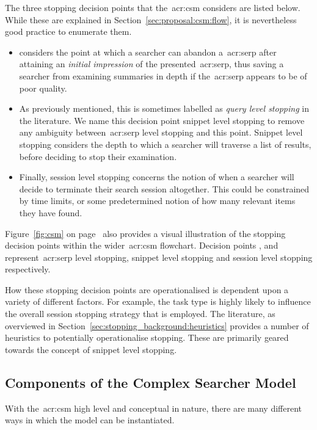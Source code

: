 The three stopping decision points that the~\gls{acr:csm} considers are listed below. While these are explained in Section~\ref{sec:proposal:csm:flow}, it is nevertheless good practice to enumerate them.

\begin{itemize}
    
    \item{ considers the point at which a searcher can abandon a~\gls{acr:serp} after attaining an \emph{initial impression} of the presented~\gls{acr:serp}, thus saving a searcher from examining summaries in depth if the~\gls{acr:serp} appears to be of poor quality.}
    
    \item{ As previously mentioned, this is sometimes labelled as \emph{query level stopping} in the literature. We name this decision point snippet level stopping to remove any ambiguity between~\gls{acr:serp} level stopping and this point. Snippet level stopping considers the depth to which a searcher will traverse a list of results, before deciding to stop their examination.}
    
    \item{ Finally, session level stopping concerns the notion of when a searcher will decide to terminate their search session altogether. This could be constrained by time limits, or some predetermined notion of how many relevant items they have found.}
    
\end{itemize}

Figure~\ref{fig:csm} on page~\pageref{fig:csm} also provides a visual illustration of the stopping decision points within the wider~\gls{acr:csm} flowchart. Decision points ,  and  represent~\gls{acr:serp} level stopping, snippet level stopping and session level stopping respectively.

How these stopping decision points are operationalised is dependent upon a variety of different factors. For example, the task type is highly likely to influence the overall session stopping strategy that is employed. The literature, as overviewed in Section~\ref{sec:stopping_background:heuristics} provides a number of heuristics to potentially operationalise stopping. These are primarily geared towards the concept of snippet level stopping.

\subsection{Components of the Complex Searcher Model}
With the~\gls{acr:csm} high level and conceptual in nature, there are many different ways in which the model can be instantiated.


